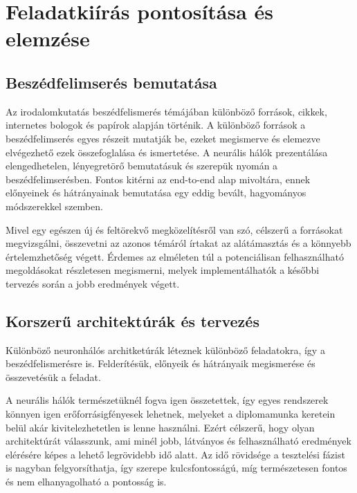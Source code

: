 \chapter{Feladatkiírás pontosítása és elemzése}

\section{Beszédfelimserés bemutatása}

Az irodalomkutatás beszédfelismerés témájában különböző források, cikkek, internetes bologok és papírok alapján történik. A különböző források a beszédfelimserés egyes részeit mutatják be, ezeket megismerve és elemezve elvégezhető ezek összefoglalása és ismertetése. A neurális hálók prezentálása elengedhetelen, lényegretörő bemutatásuk és szerepük nyomán a beszédfelimserésben. Fontos kitérni az end-to-end alap mivoltára, ennek előnyeinek és hátrányainak bemutatása egy eddig bevált, hagyományos módszerekkel szemben.

Mivel egy egészen új és feltörekvő megközelítésről van szó, célszerű a forrásokat megvizsgálni, összevetni az azonos témáról írtakat az alátámasztás és a könnyebb értelemzhetőség végett. Érdemes az elméleten túl a potenciálisan felhasználható megoldásokat részletesen megismerni, melyek implementálhatók a későbbi tervezés során a jobb eredmények végett.

\section{Korszerű architektúrák és tervezés}

Különböző neuronhálós architketúrák léteznek különböző feladatokra, így a beszédfelismerésre is. Felderítésük, előnyeik és hátrányaik megismerése és összevetésük a feladat. 

A neurális hálók természetüknél fogva igen összetettek, így egyes rendszerek könnyen igen erőforrásigfényesek lehetnek, melyeket a diplomamunka keretein belül akár kivitelezhetetlen is lenne használni. Ezért célszerű, hogy olyan architektúrát válasszunk, ami minél jobb, látványos és felhasználható eredmények elérésére képes a lehető legrövidebb idő alatt. Az idő rövidsége a tesztelési fázist is nagyban felgyorsíthatja, így szerepe kulcsfontosságú, míg természetesen fontos és nem elhanyagolható a pontosság is.

